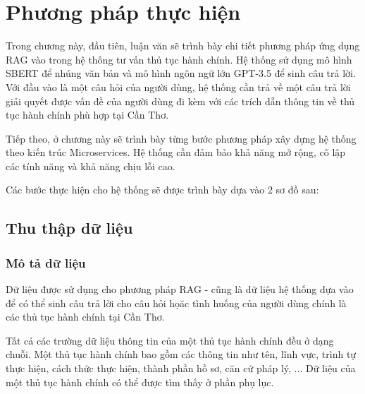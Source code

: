 \documentclass[a4paper, 12pt, openany]{book}
\begin{document}
\section{Phương pháp thực hiện}
Trong chương này, đầu tiên, luận văn sẽ trình bày chi tiết phương pháp ứng dụng RAG vào trong hệ thống tư vấn thủ tục hành chính. Hệ thống sử dụng
mô hình SBERT để nhúng văn bản và mô hình ngôn ngữ lớn GPT-3.5 để sinh câu trả lời. Với đầu vào là một câu hỏi của người dùng, 
hệ thống cần trả về một câu trả lời giải quyết được vấn đề của người dùng đi kèm với các trích dẫn thông tin về thủ tục hành chính phù hợp tại Cần Thơ.

Tiếp theo, ở chương này sẽ trình bày từng bước phương pháp xây dựng hệ thống theo kiến trúc Microservices.
Hệ thống cần đảm bảo khả năng mở rộng, cô lập các tính năng và khả năng chịu lỗi cao.

Các bước thực hiện cho hệ thống sẽ được trình bày dựa vào 2 sơ đồ sau:
\subsection{Thu thập dữ liệu}
\subsubsection{Mô tả dữ liệu}
Dữ liệu được sử dụng cho phương pháp RAG - cũng là dữ liệu hệ thống dựa vào để có thể sinh câu trả lời cho câu hỏi họăc tình huống
của người dùng chính là các thủ tục hành chính tại Cần Thơ.

Tất cả các trường dữ liệu thông tin của một thủ tục hành chính đều ở dạng chuỗi. Một thủ tục hành chính bao gồm các thông tin như tên, lĩnh vực, trình tự thực hiện,
cách thức thực hiện, thành phần hồ sơ, căn cứ pháp lý, ... Dữ liệu của một thủ tục hành chính có thể được tìm thấy ở phần phụ lục.
\end{document}
